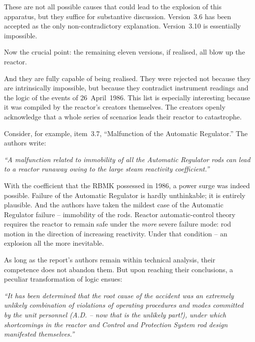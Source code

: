 \documentclass[openright]{bookest}
\begin{document}
These are not all possible causes that could lead to the explosion of this apparatus, but they suffice for substantive discussion. Version~3.6 has been accepted as the only non-contradictory explanation. Version~3.10 is essentially impossible.

Now the crucial point: the remaining eleven versions, if realised, all blow up the reactor.

And they are fully capable of being realised. They were rejected not because they are intrinsically impossible, but because they contradict instrument readings and the logic of the events of 26~April~1986. This list is especially interesting because it was compiled by the reactor's creators themselves. The creators openly acknowledge that a whole series of scenarios leads their reactor to catastrophe.

Consider, for example, item~3.7, ``Malfunction of the Automatic Regulator.'' The authors write:

\begin{personal}
\textit{``A malfunction related to immobility of all the Automatic Regulator rods can lead to a reactor runaway owing to the large steam reactivity coefficient.''}
\end{personal}

With the coefficient that the RBMK possessed in 1986, a power surge was indeed possible. Failure of the Automatic Regulator is hardly unthinkable; it is entirely plausible. And the authors have taken the mildest case of the Automatic Regulator failure -- immobility of the rods. Reactor automatic-control theory requires the reactor to remain safe under the \textit{more} severe failure mode: rod motion in the direction of increasing reactivity. Under that condition -- an explosion all the more inevitable.

As long as the report's authors remain within technical analysis, their competence does not abandon them. But upon reaching their conclusions, a peculiar transformation of logic ensues:

\begin{personal}
\textit{``It has been determined that the root cause of the accident was an extremely unlikely combination of violations of operating procedures and modes committed by the unit personnel (A.D. -- now that is the unlikely part!), under which shortcomings in the reactor and Control and Protection System rod design manifested themselves.''}
\end{personal}
\end{document}
